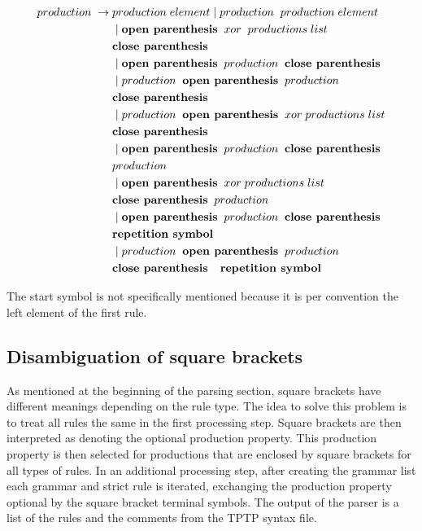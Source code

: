 \begin{align*}
	production\; \rightarrow\; &production\; element
                \mid production\;\; production\; element \\
               &\mid \textbf{open parenthesis}\;\; xor\; \;productions\; list\;\; \\
               &\textbf{close parenthesis} \\
               &\mid \textbf{open parenthesis}\;\; production\;\; \textbf{close parenthesis} \\
               &\mid production \;\;\textbf{open parenthesis}\;\; production \\
               &\textbf{close parenthesis} \\
               &\mid production\;\; \textbf{open parenthesis} \;\;xor \;productions\; list\\
               &\textbf{close parenthesis} \\
               &\mid \textbf{open parenthesis} \;\;production \;\;\textbf{close parenthesis} \\
               &production \\
               &\mid \textbf{open parenthesis}\;\; xor\; productions\; list\\ 
               &\textbf{close parenthesis}\;\; production \\
               &\mid \textbf{open parenthesis}\;\; production\;\; \textbf{close parenthesis} \\
               &\textbf{repetition symbol}\\
               &\mid production\;\; \textbf{open parenthesis} \;\;production \\
               &\textbf{close parenthesis \; repetition symbol}
\end{align*}


The start symbol is not specifically mentioned because it is per convention the left element of the first rule.


\subsection{Disambiguation of  square brackets}\label{sec:ConceptDisambiguation}
As mentioned at the beginning of the parsing section, square brackets have different meanings depending on the rule type.
The idea to solve this problem is to treat all rules the same in the first processing step.
Square brackets are then interpreted as denoting the optional production property.
This production property is then selected for productions that are enclosed by square brackets for all types of rules.
In an additional processing step, after creating the grammar list each grammar and strict rule is iterated, exchanging the production property optional by the square bracket terminal symbols.
The output of the parser is a list of the rules and the comments from the \ac{TPTP} syntax file.

